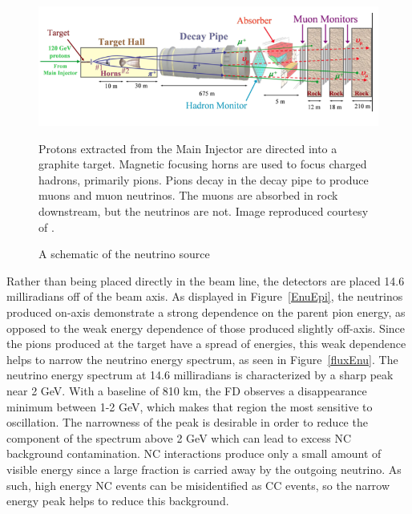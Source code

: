 \begin{figure}
  \begin{center}
    \includegraphics[width=\textwidth]{figures/figures/numi.png}
  \end{center}
  \caption{A schematic of the \numi neutrino source}{Protons extracted from the
   Main Injector are directed into a graphite target.  Magnetic focusing horns
   are used to focus charged hadrons, primarily pions.
   Pions decay in the decay pipe to produce muons and muon neutrinos.
   The muons are absorbed in rock downstream, but the neutrinos are not.
   Image reproduced courtesy of \cite{zwaska2005thesis}.}
  \label{numi}
\end{figure}

Rather than being placed directly in the \numi beam line, the \nova detectors are placed 14.6 milliradians off of the beam axis.  As displayed in Figure~\ref{EnuEpi}, the neutrinos produced on-axis demonstrate a strong dependence on the parent pion energy, as opposed to the weak energy dependence of those produced slightly off-axis.  Since the pions produced at the target have a spread of energies, this weak dependence helps to narrow the neutrino energy spectrum, as seen in Figure~\ref{fluxEnu}.  The neutrino energy spectrum at 14.6 milliradians is characterized by a sharp peak near 2 GeV.
With a baseline of 810 km, the \nova FD observes a \numu
disappearance minimum between 1-2 GeV, which makes that region the most
sensitive to oscillation.
The narrowness of the peak is desirable in order to reduce the component
of the spectrum above 2 GeV which can lead to excess NC background
contamination.
NC interactions produce only a small amount of visible energy since a large
fraction is carried away by the outgoing neutrino.
As such, high energy NC events can be misidentified as CC events, so the narrow
energy peak helps to reduce this background.

